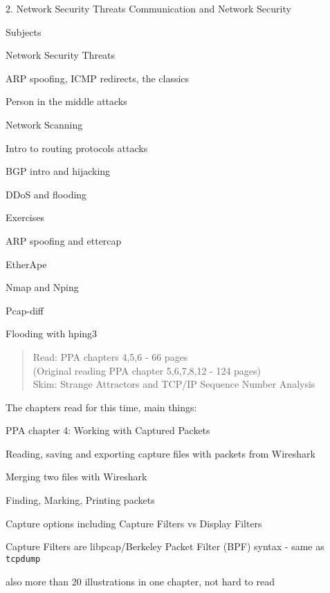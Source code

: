 \documentclass[Screen16to9,17pt]{foils}
\begin{document}
\mytitlepage
{2. Network Security Threats}
{Communication and Network Security \the\year}


\begin{list1}
\item Subjects
\begin{list2}
\item Network Security Threats
\item ARP spoofing, ICMP redirects, the classics
\item Person in the middle attacks
\item Network Scanning
\item Intro to routing protocols attacks
\item BGP intro and hijacking
\item DDoS and flooding
\end{list2}
\item Exercises
\begin{list2}
\item ARP spoofing and ettercap
\item EtherApe
\item Nmap and Nping
\item Pcap-diff
\item Flooding with hping3
\end{list2}
\end{list1}



\begin{quote}
Read: PPA chapters 4,5,6 - 66 pages\\
(Original reading PPA chapter 5,6,7,8,12 - 124 pages)\\
Skim: Strange Attractors and TCP/IP Sequence Number Analysis
\end{quote}

\begin{list1}
\item The chapters read for this time, main things:
\item PPA chapter 4: Working with Captured Packets
\begin{list2}
\item Reading, saving and exporting capture files with packets from Wireshark
\item Merging two files with Wireshark
\item Finding, Marking, Printing packets
\item Capture options including Capture Filters vs Display Filters
\item Capture Filters are libpcap/Berkeley Packet
Filter (BPF) syntax - same as \verb+tcpdump+
\end{list2}
\item also more than 20 illustrations in one chapter, not hard to read
\end{list1}
\end{document}
